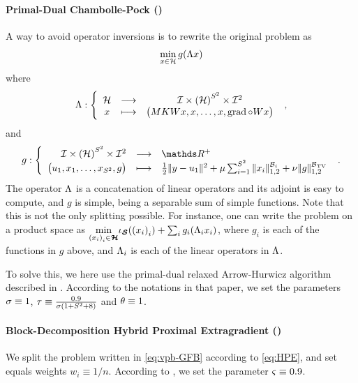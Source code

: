 \paragraph{Primal-Dual Chambolle-Pock (\ChPo)} A way to avoid operator inversions is to rewrite the original problem as
%
\begin{equation*}
  \underset{x \in \mathcal{H}}{\min} \, g (\Lambda x)
\end{equation*}
% 
where
%
\begin{equation*}
 \Lambda : \left\{ \begin{array}{ccc} \mathcal{H} & \longrightarrow & \mathcal{I} \times \left( \mathcal{H} \right)^{S^2} \times \mathcal{I}^2\\
     x & \longmapsto & \big(  M K W x, x, \dots, x, \operatorname{grad} \circ W x \big) \end{array} \right.~,
\end{equation*}
% 
and
%
\begin{equation*}
g : \left\{ \begin{array}{rcl} \RNN \times \pa{\Hh}^{S^2} \times \RG & \longrightarrow & \R^+ \\
    \bpa{ u_1, x_1, \dots, x_{S^2}, g} & \longmapsto & \half \norm{y - u_1}^2 + \musp \sum_{i=1}^{S^2} \norm{x_i}_{1,2}^{\Bb_i} + \mutv \normbktv{g} \end{array} \right.~.
\end{equation*}
%
The operator $\Lambda$ is a concatenation of linear operators and its adjoint is easy to compute, and $g$ is simple, being a separable sum of simple functions. Note that this is not the only splitting possible. For instance, one can write the problem on a product space as $\underset{\left( x_i \right)_i \in \boldsymbol {\mathcal{H}}}{\min} \iota_{\boldsymbol {\mathcal{S}}}(\left( x_i \right)_i) + \sum_i g_i(\Lambda_i x_i)$, where $g_i$ is each of the functions in $g$ above, and $\Lambda_i$ is each of the linear operators in $\Lambda$.

To solve this, we here use the primal-dual relaxed Arrow-Hurwicz algorithm described in \cite{ChambollePock11}. According to the notations in that paper, we set the parameters $\sigma \equiv 1$, $\tau \equiv \frac{0.9}{\sigma(1+S^2+8)}$ and $\theta \equiv 1$.

\paragraph{Block-Decomposition Hybrid Proximal Extragradient (\HPE)} We split the problem written in \eqref{eq:vpb-GFB} according to \eqref{eq:HPE}, and set equals weights $w_i \equiv 1/n$. According to , we set the parameter $\varsigma \equiv 0.9$.

